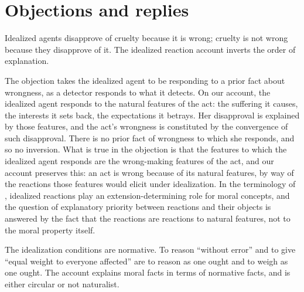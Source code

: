 \documentclass{situationist-preprint}
\begin{document}
\section{Objections and replies}\label{s:obj}

\begin{objection}[Euthyphro]
Idealized agents disapprove of cruelty because it is wrong; cruelty is not wrong because they disapprove of it. The idealized reaction account inverts the order of explanation.
\end{objection}

\begin{reply}
The objection takes the idealized agent to be responding to a prior fact about wrongness, as a detector responds to what it detects. On our account, the idealized agent responds to the natural features of the act: the suffering it causes, the interests it sets back, the expectations it betrays. Her disapproval is explained by those features, and the act's wrongness is constituted by the convergence of such disapproval. There is no prior fact of wrongness to which she responds, and so no inversion. What is true in the objection is that the features to which the idealized agent responds are the wrong-making features of the act, and our account preserves this: an act is wrong because of its natural features, by way of the reactions those features would elicit under idealization. In the terminology of \citet{Wright1992}, idealized reactions play an extension-determining role for moral concepts, and the question of explanatory priority between reactions and their objects is answered by the fact that the reactions are reactions to natural features, not to the moral property itself.
\end{reply}

\begin{objection}[Circularity]
The idealization conditions are normative. To reason \enquote{without error} and to give \enquote{equal weight to everyone affected} are to reason as one ought and to weigh as one ought. The account explains moral facts in terms of normative facts, and is either circular or not naturalist.
\end{objection}
\end{document}
